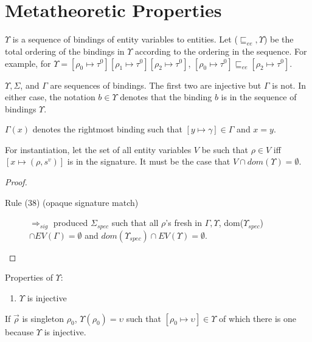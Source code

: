 
\section{Metatheoretic Properties} 
$\Upsilon$ is a sequence of bindings of entity variables to entities. Let ($\sqsubseteq_{ee}, \Upsilon$) be the total ordering of the bindings in $\Upsilon$ according to the ordering in the sequence. For example, for $\Upsilon = [\rho_0 \mapsto \tau^0][\rho_1 \mapsto \tau^0][\rho_2 \mapsto \tau^0]$, $[\rho_0 \mapsto \tau^0] \sqsubseteq_{ee} [\rho_2 \mapsto \tau^0]$. 

$\Upsilon, \Sigma$, and $\Gamma$ are sequences of bindings. The first two are injective but $\Gamma$ is not. In either case, the notation $b \in \Upsilon$ denotes that the binding $b$ is in the sequence of bindings $\Upsilon$. 

\begin{definition}
$\Gamma(x)$ denotes the rightmost binding such that $[y\mapsto \gamma] \in \Gamma$ and $x=y$. 
\end{definition}


\begin{lemma}
For instantiation, let the set of all entity variables $V$ be such that $\rho\in V$ iff $[x\mapsto(\rho,s^v)]$ is in the signature. It must be the case that $V\cap dom(\Upsilon) = \emptyset$.
\end{lemma}
\begin{proof}
\begin{description}
\item[Rule (38) (opaque signature match)] $\Rightarrow_{sig}$ produced $\Sigma_{spec}$ such that all $\rho$'s fresh in $\Gamma,\Upsilon$, dom($\Upsilon_{spec}$)$\cap EV(\Gamma) = \emptyset$ and $dom(\Upsilon_{spec})\cap EV(\Upsilon) = \emptyset$. 
\end{description}
\end{proof}

Properties of $\Upsilon$: 
\begin{enumerate}
\item $\Upsilon$ is injective
\end{enumerate}


\begin{definition}[$\Upsilon(\vec{\rho})$]
If $\vec{\rho}$ is singleton $\rho_0$, $\Upsilon(\rho_0) = \upsilon$ such that $[\rho_0\mapsto\upsilon] \in \Upsilon$ of which there is one because $\Upsilon$ is injective. 
\end{definition}

